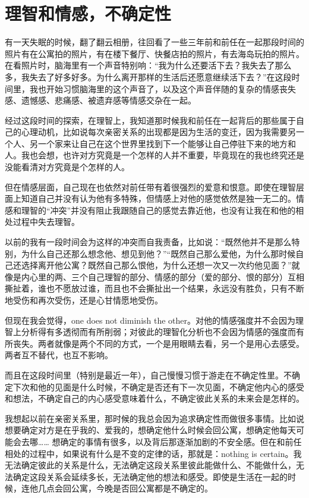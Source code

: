 \chapter{理智和情感，不确定性}




有一天失眠的时候，翻了翻云相册，往回看了一些三年前和前任在一起那段时间的照片\pozhehao{}有在公寓拍的照片，有在楼下餐厅、快餐店拍的照片，有去海岛玩拍的照片。在看照片时，脑海里有一个声音特别响：“我为什么还要活下去？我失去了那么多，我失去了好多好多。为什么离开那样的生活后还愿意继续活下去？”在这段时间里，我也开始习惯脑海里的这个声音了，以及这个声音伴随的复杂的情感\pozhehao{}丧失感、遗憾感、悲痛感、被遗弃感等情感交杂在一起。

经过这段时间的探索，在理智上，我知道那时候我和前任在一起背后的那些属于自己的心理动机，比如说每次亲密关系的出现都是因为生活的变迁，因为我需要另一个人、另一个家来让自己在这个世界里找到下一个能够让自己停驻下来的地方和人。我也会想，也许对方究竟是一个怎样的人并不重要，毕竟现在的我也终究还是没能看清对方究竟是个怎样的人。

但在情感层面，自己现在也依然对前任带有着很强烈的爱意和恨意。即使在理智层面上知道自己并没有认为他有多特殊，但情感上对他的感觉依然是独一无二的。情感和理智的“冲突”并没有阻止我跟随自己的感觉去靠近他，也没有让我在和他的相处过程中失去理智。

以前的我有一段时间会为这样的冲突而自我责备，比如说：“既然他并不是那么特别，为什么自己还那么想念他、想见到他？”“既然自己那么爱他，为什么那时候自己还选择离开他公寓？既然自己那么恨他，为什么还想一次又一次约他见面？”就像是内心里的两、三个自己\pozhehao{}理智的部分、情感的部分（爱的部分、恨的部分）\pozhehao{}互相撕扯着，谁也不愿放过谁，而且也不会撕扯出一个结果，永远没有胜负，只有不断地受伤和再次受伤，还是心甘情愿地受伤。

但现在我会觉得，one does not diminish the other。对他的情感强度并不会因为理智上分析得有多透彻而有所削弱；对彼此的理智化分析也不会因为情感的强度而有所丧失。两者就像是两个不同的方式，一个是用眼睛去看，另一个是用心去感受。两者互不替代，也互不影响。

而且在这段时间里（特别是最近一年），自己慢慢习惯于游走在不确定性里。不确定下次和他的见面是什么时候，不确定是否还有下一次见面，不确定他内心的感受和想法，不确定自己的内心感受意味着什么，不确定彼此关系的未来会是怎样的。

我想起以前在亲密关系里，那时候的我总会因为追求确定性而做很多事情。比如说想要确定对方是在乎我的、爱我的，想确定他什么时候会回公寓，想确定他每天可能会去哪…… 想确定的事情有很多，以及背后那逐渐加剧的不安全感。但在和前任相处的过程中，如果说有什么是不变的定律的话，那就是：nothing is certain。我无法确定彼此的关系是什么，无法确定这段关系里彼此能做什么、不能做什么，无法确定这段关系会延续多长，无法确定他的想法和感受。即使是生活在一起的时候，连他几点会回公寓，今晚是否回公寓都是不确定的。

